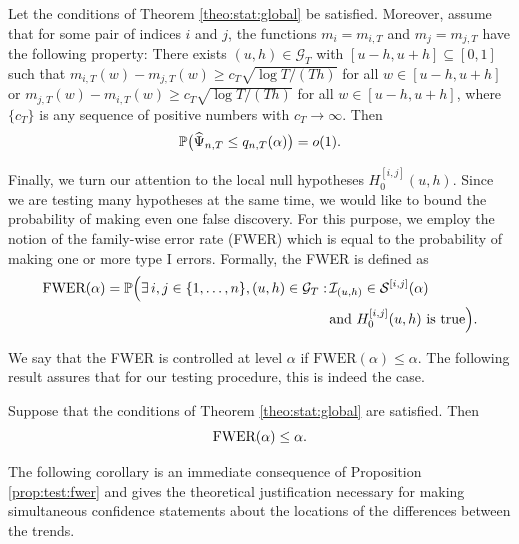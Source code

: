 \documentclass[a4paper,12pt]{article}
\begin{document}
\begin{prop}\label{prop:test:power}
Let the conditions  of Theorem \ref{theo:stat:global} be satisfied. Moreover, assume that for some pair of indices $i$ and $j$, the functions $m_ i = m_{i,T}$ and $m_ j = m_{j,T}$ have the following property: There exists $(u, h) \in \mathcal{G}_T$ with $[u-h, u+h] \subseteq [0,1]$ such that $m_{i,T}(w) - m_{j,T}(w) \ge c_T \sqrt{\log T/(Th)}$ for all $w \in [u-h, u+h]$ or $m_{j,T}(w) - m_{i,T}(w) \ge c_T \sqrt{\log T/(Th)}$ for all $w \in [u-h, u+h]$, where $\{c_T\}$ is any sequence of positive numbers with $c_T \rightarrow \infty$. Then 
\[ \mathbb{P} \big( \widehat{\Psi}_{n,T} \le q_{n,T}(\alpha) \big) = o(1). \]
\end{prop}


Finally, we turn our attention to the local null hypotheses $H_0^{[i, j]}(u, h)$. Since we are testing many hypotheses at the same time, we would like to bound the probability of making even one false discovery. For this purpose, we employ the notion of the family-wise error rate (FWER) which is equal to the probability of making one or more type I errors. Formally, the FWER is defined as
\begin{align*} 
\text{FWER}(\alpha) = \mathbb{P} \Big(\exists \,  i, j \in \{1, \ldots, n \}, (u, h) \in \mathcal{G}_T : & \, \mathcal{I}_{(u, h)} \in \mathcal{S}^{[i, j]}(\alpha) \\ & \, \text{and } H_0^{[i, j]}(u, h) \text { is true}\Big).
\end{align*}

We say that the FWER is controlled at level $\alpha$ if $\text{FWER}(\alpha) \leq \alpha$. The following result assures that for our testing procedure, this is indeed the case.

\begin{prop}\label{prop:test:fwer}
Suppose that the conditions  of Theorem \ref{theo:stat:global} are satisfied. Then 
\[ \textnormal{FWER}(\alpha) \leq \alpha. \]
\end{prop}


The following corollary is an immediate consequence of Proposition \ref{prop:test:fwer} and gives the theoretical justification necessary for making simultaneous confidence statements about the locations of the differences between the trends.
\end{document}
